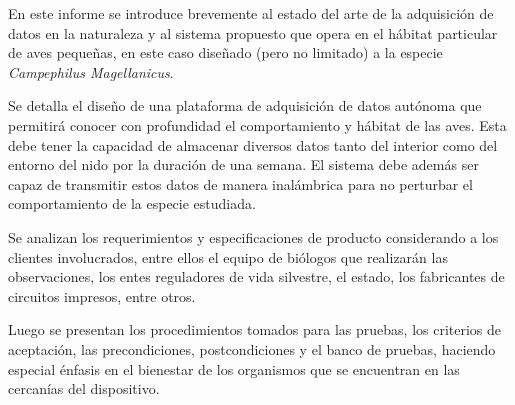 %

%

En este informe se introduce brevemente al estado del arte de la adquisición de datos en la naturaleza y al sistema propuesto que opera en el hábitat particular de aves pequeñas, en este caso diseñado (pero no limitado) a la especie \textit{Campephilus Magellanicus}. 

Se detalla el diseño de una plataforma de adquisición de datos autónoma que permitirá conocer con profundidad el comportamiento y hábitat de las aves. Esta debe tener la capacidad de almacenar diversos datos tanto del interior como del entorno del nido por la duración de una semana. El sistema debe además ser capaz de transmitir estos datos de manera inalámbrica para no perturbar el comportamiento de la especie estudiada.

Se analizan los requerimientos y especificaciones de producto considerando a los clientes involucrados, entre ellos el equipo de biólogos que realizarán las observaciones, los entes reguladores de vida silvestre, el estado, los fabricantes de circuitos impresos, entre otros.

Luego se presentan los procedimientos tomados para las pruebas, los criterios de aceptación, las precondiciones, postcondiciones y el banco de pruebas, haciendo especial énfasis en el bienestar de los organismos que se encuentran en las cercanías del dispositivo.\\
\TBC
%
